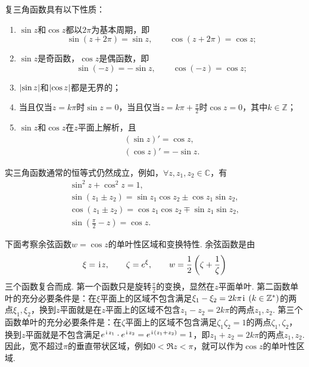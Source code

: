 \begin{property}
复三角函数具有以下性质：
\begin{enumerate}
\item \(\sin z\)和\(\cos z\)都以\(2\pi\)为基本周期，即\begin{equation*}
\sin(z+2\pi) = \sin z, \qquad
\cos(z+2\pi) = \cos z;
\end{equation*}
\item \(\sin z\)是奇函数，\(\cos z\)是偶函数，即\begin{equation*}
\sin(-z) = -\sin z, \qquad
\cos(-z) = \cos z;
\end{equation*}
\item \(\abs{\sin z}\)和\(\abs{\cos z}\)都是无界的；
\item 当且仅当\(z = k\pi\)时\(\sin z = 0\)，当且仅当\(z = k\pi+\frac{\pi}{2}\)时\(\cos z = 0\)，其中\(k\in\mathbb{Z}\)；
\item \(\sin z\)和\(\cos z\)在\(z\)平面上解析，且\begin{gather}
(\sin z)' = \cos z, \label{equation:解析函数.正弦函数的导数} \\
(\cos z)' = -\sin z. \label{equation:解析函数.余弦函数的导数}
\end{gather}
\end{enumerate}
\end{property}

\begin{theorem}
实三角函数通常的恒等式仍然成立，例如，\(\forall z,z_1,z_2 \in \mathbb{C}\)，有\begin{gather}
\sin^2 z + \cos^2 z = 1, \\
\sin(z_1 \pm z_2) = \sin z_1 \cos z_2 \pm \cos z_1 \sin z_2, \\
\cos(z_1 \pm z_2) = \cos z_1 \cos z_2 \mp \sin z_1 \sin z_2, \\
\sin(\frac{\pi}{2}-z)=\cos z.
\end{gather}
\end{theorem}

下面考察余弦函数\(w = \cos z\)的单叶性区域和变换特性.
余弦函数是由\begin{equation*}
\xi = \kern1pt\mathrm{i}\kern1pt z,
\qquad
\zeta = e^{\xi},
\qquad
w = \frac{1}{2} \left( \zeta + \frac{1}{\zeta} \right)
\end{equation*}三个函数复合而成.
第一个函数只是旋转\(\frac{\pi}{2}\)的变换，显然在\(z\)平面单叶.
第二函数单叶的充分必要条件是：在\(\xi\)平面上的区域不包含满足\(\xi_1 - \xi_2 = 2k\pi\iu\ (k\in\mathbb{Z}^*)\)的两点\(\xi_1,\xi_2\)，换到\(z\)平面就是在\(z\)平面上的区域不包含\(z_1 - z_2 = 2k\pi\)的两点\(z_1,z_2\).
第三个函数单叶的充分必要条件是：在\(\zeta\)平面上的区域不包含满足\(\zeta_1 \zeta_2 = 1\)的两点\(\zeta_1,\zeta_2\)，换到\(z\)平面就是不包含满足\(e^{\kern1pt\mathrm{i}\kern1pt z_1} \cdot e^{\kern1pt\mathrm{i}\kern1pt z_2} = e^{\kern1pt\mathrm{i}\kern1pt(z_1+z_2)} = 1\)，即\(z_1 + z_2 = 2k\pi\)的两点\(z_1,z_2\).
因此，宽不超过\(\pi\)的垂直带状区域，例如\(0 < \Re z < \pi\)，就可以作为\(\cos z\)的单叶性区域.

